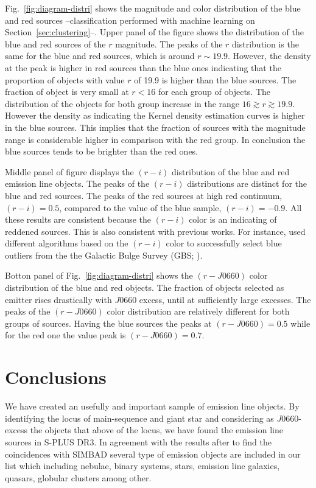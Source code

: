 \documentclass[fleqn,usenatbib]{mnras}
\begin{document}
Fig.~\ref{fig:diagram-distri} shows the magnitude and color distribution of the blue and red
sources --classification performed with machine learning on Section~\ref{sec:clustering}--.
Upper panel of the figure shows the distribution of the blue and red sources of the $r$ magnitude.
The peaks of the $r$ distribution is the same for the blue and red sources, which is around
$r \sim 19.9$. However, the density at the peak is higher in red sources than the blue ones
indicating that the proportion of objects with value $r$ of 19.9 is higher than the blue sources.
The fraction of object is very small at $r < 16$ for each group of objects.
The distribution of the objects for both group increase in the range $16 \gtrsim r \gtrsim 19.9$.
However the density as indicating the Kernel density estimation curves is higher in the
blue sources. This implies that the fraction of sources with the magnitude range is considerable
higher in comparison with the red group. In conclusion the blue sources tends to be brighter
than the red ones.

Middle panel of figure displays the $(r - i)$ distribution of the blue and red emission line
objects. The peaks of the $(r - i)$ distributions are distinct for the blue and red sources.
The peaks of the red sources at high red continuum,  $(r - i) = 0.5$, compared to the value
of the blue sample, $(r - i) = -0.9$. All these results are consistent because the $(r - i)$
color is an indicating of reddened sources. This is also consistent with previous works. 
For instance, \citet{Wevers:2017} used different algorithms based on the  $(r - i)$ color
to successfully select blue outliers from the the Galactic Bulge Survey (GBS; \citealp{Jonker:2011}).

Botton panel of Fig.~\ref{fig:diagram-distri} shows the
$(r - J0660)$ color distribution of the blue and red objects.  The fraction of objects selected
as emitter rises drastically with $J$0660 excess, until at sufficiently large excesses. The peaks
of the $(r - J0660)$ color distribution are relatively different for both groups of sources.
Having the blue sources the peaks at  $(r - J0660) = 0.5$ while for the red one the value peak
is $(r - J0660)=0.7$.


\section{Conclusions}

We have created an usefully and important sample of emission line objects.
By identifying the locus of main-sequence and giant star and considering as
$J0660$-excess the objects that above of the locus, we have found
the emission line sources in S-PLUS DR3. In agreement with the results after
to find the coincidences with SIMBAD several type of emission objects are included
in our list which including nebulae, binary systems, stars, emission line galaxies,
quasars, globular clusters among other. \\
\end{document}
